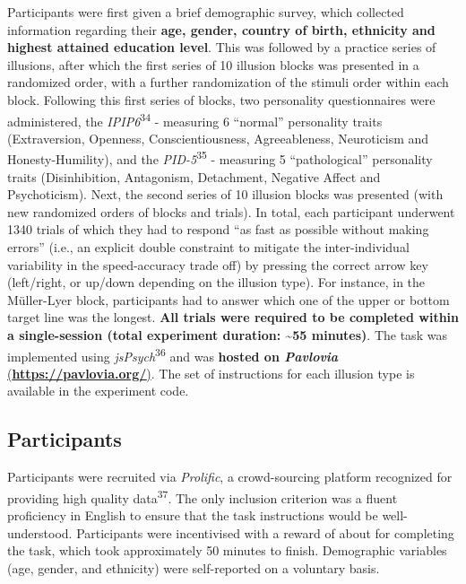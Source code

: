 \documentclass[
  man,floatsintext]{apa6}
\begin{document}
Participants were first given a brief demographic survey, which collected information regarding their \textbf{age, gender, country of birth, ethnicity and highest attained education level}. This was followed by a practice series of illusions, after which the first series of 10 illusion blocks was presented in a randomized order, with a further randomization of the stimuli order within each block. Following this first series of blocks, two personality questionnaires were administered, the \emph{IPIP6}\textsuperscript{34} - measuring 6 ``normal'' personality traits (Extraversion, Openness, Conscientiousness, Agreeableness, Neuroticism and Honesty-Humility), and the \emph{PID-5}\textsuperscript{35} - measuring 5 ``pathological'' personality traits (Disinhibition, Antagonism, Detachment, Negative Affect and Psychoticism). Next, the second series of 10 illusion blocks was presented (with new randomized orders of blocks and trials). In total, each participant underwent 1340 trials of which they had to respond ``as fast as possible without making errors'' (i.e., an explicit double constraint to mitigate the inter-individual variability in the speed-accuracy trade off) by pressing the correct arrow key (left/right, or up/down depending on the illusion type). For instance, in the Müller-Lyer block, participants had to answer which one of the upper or bottom target line was the longest. \textbf{All trials were required to be completed within a single-session (total experiment duration: \textasciitilde55 minutes)}. The task was implemented using \emph{jsPsych}\textsuperscript{36} and was \textbf{hosted on \emph{Pavlovia} } \href{https://pavlovia.org/}{(\textbf{https://pavlovia.org/})}. The set of instructions for each illusion type is available in the experiment code.

\hypertarget{participants}{%
\subsection{Participants}\label{participants}}

Participants were recruited via \emph{Prolific}, a crowd-sourcing platform recognized for providing high quality data\textsuperscript{37}. The only inclusion criterion was a fluent proficiency in English to ensure that the task instructions would be well-understood. Participants were incentivised with a reward of about  for completing the task, which took approximately 50 minutes to finish. Demographic variables (age, gender, and ethnicity) were self-reported on a voluntary basis.
\end{document}
